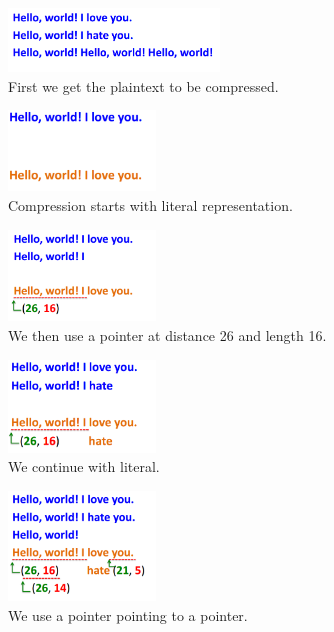 \begin{figure}[H] \caption{First we get the plaintext to be compressed.}
\centering
\includegraphics[width=0.5\textwidth]{diagrams/lz77_1.png}\end{figure}
\begin{figure}[H] \caption{Compression starts with literal representation.}
\centering
\includegraphics[width=0.35\textwidth]{diagrams/lz77_2.png}\end{figure}
\begin{figure}[H] \caption{We then use a pointer at distance 26 and length 16.}
\centering
\includegraphics[width=0.35\textwidth]{diagrams/lz77_3.png}\end{figure}
\begin{figure}[H] \caption{We continue with literal.} \centering
\includegraphics[width=0.35\textwidth]{diagrams/lz77_4.png}\end{figure}
\begin{figure}[H] \caption{We use a pointer pointing to a pointer.} \centering
\includegraphics[width=0.35\textwidth]{diagrams/lz77_5.png}\end{figure}
